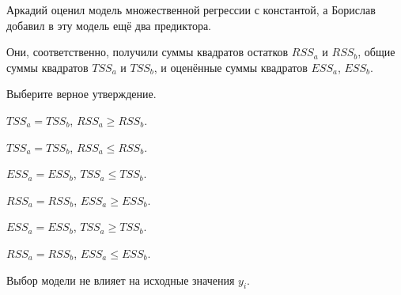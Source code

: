 
\begin{question}
Аркадий оценил модель множественной регрессии с константой,
а Борислав добавил в эту модель ещё два предиктора.

Они, соответственно, получили суммы квадратов остатков \(RSS_a\) и \(RSS_b\),
общие суммы квадратов \(TSS_a\) и \(TSS_b\), и оценённые суммы квадратов
\(ESS_a\), \(ESS_b\).

Выберите верное утверждение.
\begin{answerlist}
  \item \(TSS_a = TSS_b\), \(RSS_a \geq RSS_b\).
  \item \(TSS_a = TSS_b\), \(RSS_a \leq RSS_b\).
  \item \(ESS_a = ESS_b\), \(TSS_a \leq TSS_b\).
  \item \(RSS_a = RSS_b\), \(ESS_a \geq ESS_b\).
  \item \(ESS_a = ESS_b\), \(TSS_a \geq TSS_b\).
  \item \(RSS_a = RSS_b\), \(ESS_a \leq ESS_b\).
\end{answerlist}
\end{question}

\begin{solution}
Выбор модели не влияет на исходные значения \(y_i\).
\end{solution}

